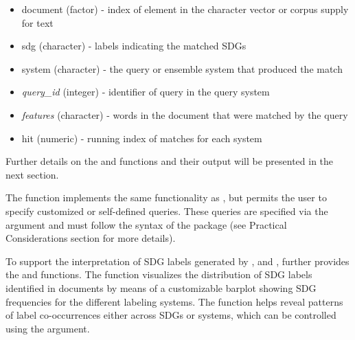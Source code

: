 \begin{itemize}
  \item document (factor) - index of element in the character vector or corpus supply for text
  \item sdg (character) - labels indicating the matched SDGs
  \item system (character) - the query or ensemble system that produced the match
  \item \textit{query\_id} (integer) - identifier of query in the query system
  \item \textit{features} (character) - words in the document that were matched by the query
  \item hit (numeric) - running index of matches for each system
\end{itemize}

Further details on the  and  functions and their output will be presented in the next section.

The  function implements the same functionality as , but permits the user to specify customized or self-defined queries. These queries are specified via the  argument and must follow the syntax of the  package (see Practical Considerations section for more details).

To support the interpretation of SDG labels generated by ,  and ,  further provides the  and   functions. The  function visualizes the distribution of SDG labels identified in documents by means of a customizable barplot showing SDG frequencies for the different labeling systems. The  function helps reveal patterns of label co-occurrences either across SDGs or systems, which can be controlled using the  argument. 


